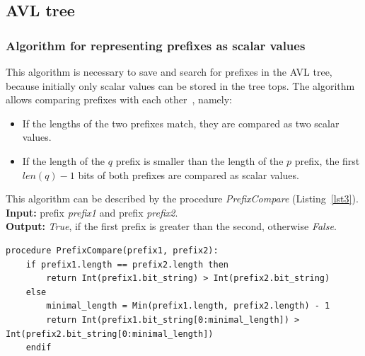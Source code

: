 \documentclass[conference]{IEEEtran}
\begin{document}
        \subsection{AVL tree}
            \subsubsection{Algorithm for representing prefixes as scalar values}
                This algorithm is necessary to save and search for prefixes in the AVL tree, 
                because initially only scalar values can be stored in the tree tops.
                The algorithm allows comparing prefixes with each other~\cite{behdadfar2011coded}, namely:
                \begin{itemize}
                    \item If the lengths of the two prefixes match, they are compared as two scalar values.
                    \item If the length of the $q$ prefix is smaller than the length of the $p$ prefix, 
                        the first $len(q) - 1$ bits of both prefixes are compared as scalar values.
                \end{itemize}
                This algorithm can be described by the procedure \emph{PrefixCompare} (Listing~\ref{lst3}). 
                \\
                {\bf Input:} prefix \emph{prefix1} and prefix \emph{prefix2}. 
                \\
                {\bf Output:} \emph{True}, if the first prefix is greater than the second, otherwise \emph{False}.
\\
\begin{lstlisting}[caption=Procedure for comparing prefixes as scalar values., label=lst3]
procedure PrefixCompare(prefix1, prefix2):
    if prefix1.length == prefix2.length then
        return Int(prefix1.bit_string) > Int(prefix2.bit_string)
    else
        minimal_length = Min(prefix1.length, prefix2.length) - 1
        return Int(prefix1.bit_string[0:minimal_length]) > Int(prefix2.bit_string[0:minimal_length])
    endif
\end{lstlisting}
\end{document}
